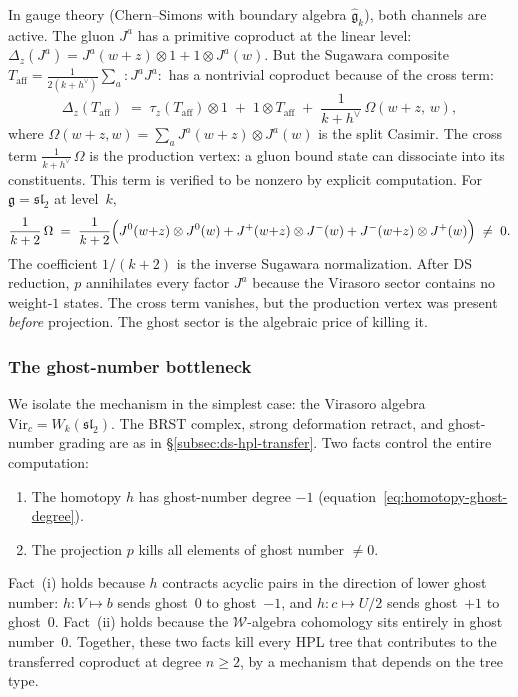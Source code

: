 In gauge theory (Chern--Simons with boundary algebra
$\widehat{\mathfrak{g}}_k$), both channels are active. The
gluon $J^a$ has a primitive coproduct at the linear level:
$\Delta_z(J^a) = J^a(w+z) \otimes 1 + 1 \otimes J^a(w)$.
But the Sugawara composite $T_{\mathrm{aff}}
= \frac{1}{2(k+h^\vee)}\sum_a {:}J^a J^a{:}$
has a nontrivial coproduct because of the cross term:
\begin{equation}\label{eq:sugawara-cross-term}
\Delta_z(T_{\mathrm{aff}})
\;=\;
\tau_z(T_{\mathrm{aff}}) \otimes 1
\;+\; 1 \otimes T_{\mathrm{aff}}
\;+\;
\frac{1}{k+h^\vee}\,\Omega(w{+}z,\, w),
\end{equation}
where $\Omega(w{+}z, w)
= \sum_a J^a(w{+}z) \otimes J^a(w)$ is the split Casimir.
The cross term $\frac{1}{k+h^\vee}\,\Omega$ is the production
vertex: a gluon bound state can dissociate into its
constituents. This term is verified to be nonzero by explicit
computation. For $\mathfrak{g} = \mathfrak{sl}_2$ at level~$k$,
\begin{equation}\label{eq:affine-cross-term-explicit}
\frac{1}{k+2}\,\Omega
\;=\;
\frac{1}{k+2}\Bigl(
J^0(w{+}z) \otimes J^0(w)
+ J^+(w{+}z) \otimes J^-(w)
+ J^-(w{+}z) \otimes J^+(w)
\Bigr)
\;\ne\; 0.
\end{equation}
The coefficient $1/(k+2)$ is the inverse Sugawara normalization.
After DS reduction, $p$ annihilates every factor $J^a$ because
the Virasoro sector contains no weight-$1$ states. The
	cross term vanishes, but the production vertex was present
\emph{before} projection. The ghost sector is the algebraic
price of killing it.

\subsubsection*{The ghost-number bottleneck}

We isolate the mechanism in the simplest case: the Virasoro
algebra $\mathrm{Vir}_c = W_k(\mathfrak{sl}_2)$. The BRST
complex, strong deformation retract, and ghost-number grading
are as in \S\ref{subsec:ds-hpl-transfer}. Two facts control
the entire computation:
\begin{enumerate}[label=\textup{(\roman*)}]
\item The homotopy $h$ has ghost-number degree $-1$
(equation~\eqref{eq:homotopy-ghost-degree}).
\item The projection $p$ kills all elements of ghost
number $\ne 0$.
\end{enumerate}
Fact~(i) holds because $h$ contracts acyclic pairs in the
direction of lower ghost number: $h \colon V \mapsto b$ sends
ghost~$0$ to ghost~$-1$, and $h \colon c \mapsto U/2$ sends
ghost~$+1$ to ghost~$0$. Fact~(ii) holds because the
$\mathcal{W}$-algebra cohomology sits entirely in ghost
number~$0$. Together, these two facts kill every HPL tree
that contributes to the transferred coproduct at degree
$n \ge 2$, by a mechanism that depends on the tree type.

